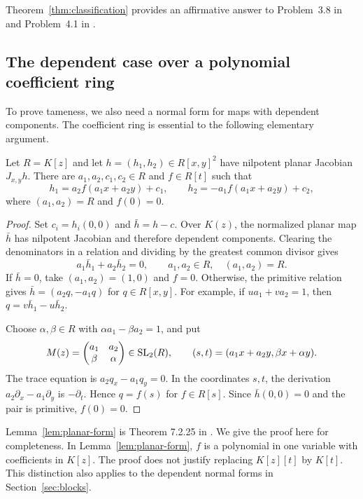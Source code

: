 \begin{remark}
Theorem~\ref{thm:classification} provides an affirmative answer to Problem~3.8 in~\cite{YanTang} and Problem~4.1 in \cite{HeYan}.
\end{remark}

\subsection{The dependent case over a polynomial coefficient ring}
To prove tameness, we also need a normal form for maps with dependent components. The coefficient ring is essential to the following elementary argument.

\begin{lemma}\label{lem:planar-form}
Let $R=K[z]$ and let $h=(h_1,h_2)\in R[x,y]^2$ have nilpotent planar Jacobian $J_{x,y}h$. There are $a_1,a_2,c_1,c_2\in R$ and $f\in R[t]$ such that
\begin{equation}\label{eq:dependent-form}
 h_1=a_2f(a_1x+a_2y)+c_1,\qquad
 h_2=-a_1f(a_1x+a_2y)+c_2,
\end{equation}
where $(a_1,a_2)=R$ and $f(0)=0$.
\end{lemma}

\begin{proof}
Set $c_i=h_i(0,0)$ and $\bar h=h-c$. Over $K(z)$, the normalized planar map $\bar h$ has nilpotent Jacobian and therefore dependent components. Clearing the denominators in a relation and dividing by the greatest common divisor gives
\[
 a_1\bar h_1+a_2\bar h_2=0,\qquad a_1,a_2\in R,\quad(a_1,a_2)=R.
\]
If $\bar h=0$, take $(a_1,a_2)=(1,0)$ and $f=0$. Otherwise, the primitive relation gives
$\bar h=(a_2q,-a_1q)$ for $q\in R[x,y]$. For example, if $u a_1+v a_2=1$, then $q=v\bar h_1-u\bar h_2$.

Choose $\alpha,\beta\in R$ with $\alpha a_1-\beta a_2=1$, and put
\begin{equation}\label{eq:unimodular-M}
 M(z)=\begin{pmatrix}a_1&a_2\\ \beta&\alpha\end{pmatrix}\in\operatorname{SL}_2(R),
 \qquad (s,t)=(a_1x+a_2y,\beta x+\alpha y).
\end{equation}
The trace equation is $a_2q_x-a_1q_y=0$. In the coordinates $s,t$, the derivation $a_2\partial_x-a_1\partial_y$ is $-\partial_t$. Hence $q=f(s)$ for $f\in R[s]$. Since $\bar h(0,0)=0$ and the pair is primitive, $f(0)=0$.
\end{proof}

\begin{remark}\label{rem:coefficient-ring}
Lemma~\ref{lem:planar-form} is Theorem 7.2.25 in \cite{EssenBook}. We give the proof here for completeness. In Lemma~\ref{lem:planar-form}, $f$ is a polynomial in one variable with coefficients in $K[z]$. The proof does not justify replacing $K[z][t]$ by $K[t]$. This distinction also applies to the dependent normal forms in Section~\ref{sec:blocks}.
\end{remark}


